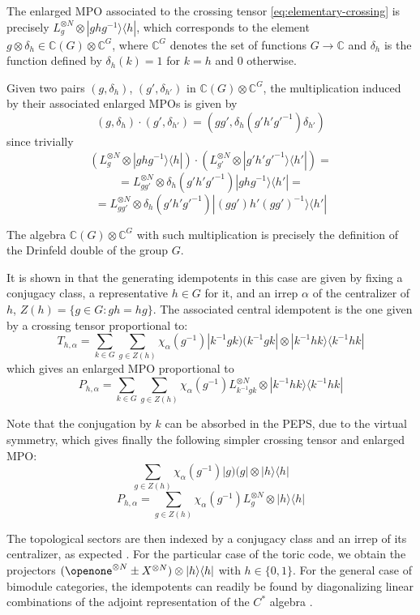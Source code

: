 \documentclass[rmp,aps,reprint,superscriptaddress,nobalancelastpage]{revtex4-1}
\def\Id{{\openone}}
\begin{document}
    The enlarged MPO associated to the crossing tensor \eqref{eq:elementary-crossing} is precisely $L_g^{\otimes N}\otimes |ghg^{-1}\rangle\langle h|$, which corresponds to the element $g\otimes \delta_h \in \mathbb{C}(G)\otimes \mathbb{C}^G$, where $\mathbb{C}^G$ denotes the set of functions $G\rightarrow \mathbb{C}$ and $\delta_h$ is the function defined by $\delta_h(k)=1$ for $k=h$ and $0$ otherwise.

    Given two pairs $(g,\delta_h)$, $(g',\delta_{h'})$ in $\mathbb{C}(G)\otimes \mathbb{C}^G$, the multiplication induced by their associated enlarged MPOs is given by
    $$(g,\delta_h)\cdot(g',\delta_{h'})= (gg',\delta_{h}(g'h'g'^{-1})\delta_{h'} )$$
    since trivially
    $$\left(L_g^{\otimes N}\otimes |ghg^{-1}\rangle\langle h|\right)
        \cdot \left(L_{g'}^{\otimes N}\otimes |g'h'g'^{-1}\rangle\langle h'|\right)=
    $$
    $$=L_{gg'}^{\otimes N}\otimes \delta_{h}(g'h'g'^{-1}) |ghg^{-1}\rangle\langle h'|=$$
    $$=L_{gg'}^{\otimes N}\otimes \delta_{h}(g'h'g'^{-1}) |(gg')h'(gg')^{-1}\rangle\langle h'|$$

    The algebra $\mathbb{C}(G)\otimes \mathbb{C}^G$ with such multiplication is precisely the definition of the Drinfeld double of the group $G$.

    It is shown in \cite{gould1993quantum} that the generating idempotents in this case are given by fixing a conjugacy class, a representative $h\in G$ for it, and an irrep $\alpha$ of the centralizer of $h$, $Z(h)=\{g\in G: gh=hg\}$.
    The associated central idempotent is the one given by a crossing tensor proportional to:
    $$T_{h,\alpha}= \sum_{k\in G}\sum_{g\in Z(h)} \chi_\alpha(g^{-1})|k^{-1}gk)(k^{-1}gk|\otimes |k^{-1}hk\rangle\langle k^{-1}hk| $$
    which gives an enlarged MPO proportional to
    $$P_{h,\alpha}=\sum_{k\in G}\sum_{g\in Z(h)} \chi_\alpha(g^{-1}) L_{k^{-1}gk}^{\otimes N}\otimes |k^{-1}hk\rangle\langle k^{-1}hk|$$

    Note that the conjugation by $k$ can be absorbed in the PEPS, due to the virtual symmetry, which gives finally the following simpler crossing tensor and enlarged MPO:
    $$\sum_{g\in Z(h)} \chi_\alpha(g^{-1})|g)(g|\otimes |h\rangle\langle h| $$
    $$P_{h,\alpha}=\sum_{g\in Z(h)} \chi_\alpha(g^{-1}) L_g^{\otimes N}\otimes |h\rangle\langle h|$$


    The topological sectors are then indexed by a conjugacy class and an irrep of its centralizer, as expected \cite{kitaev:toriccode}. For the particular case of the toric code, we obtain the projectors $(\Id^{\otimes N} \pm X^{\otimes N}) \otimes |h\rangle\langle h|$ with $h\in \{0,1\}$.
    For the general case of bimodule categories, the idempotents can readily be found by diagonalizing linear combinations of the adjoint representation of the $C^*$ algebra \cite{lootens2020matrix}.
\end{document}
